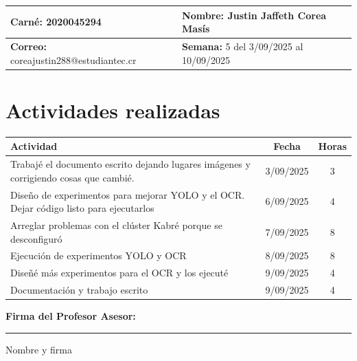 \documentclass[12pt,a4paper]{article}
\begin{document}
\noindent
\begin{tabularx}{\textwidth}{|X|X|}
\hline
\textbf{Carné:} 2020045294 & \textbf{Nombre:} Justin Jaffeth Corea Masís \\
\hline
\textbf{Correo:} coreajustin288@estudiantec.cr & \textbf{Semana:} 5 del 3/09/2025 al 10/09/2025 \\
\hline
\end{tabularx}

\vspace{0.5cm}

\section*{Actividades realizadas}

\begin{tabularx}{\textwidth}{|>{\raggedright\arraybackslash}p{12cm}|c|c|}
\hline
\textbf{Actividad} & \textbf{Fecha} & \textbf{Horas} \\
\hline
	Trabajé el documento escrito dejando lugares imágenes y corrigiendo cosas que cambié. & 3/09/2025 & 3 \\
\hline
	Diseño de experimentos para mejorar YOLO y el OCR. Dejar código listo para ejecutarlos & 6/09/2025 & 4 \\
\hline
	Arreglar problemas con el clúster Kabré porque se desconfiguró & 7/09/2025 & 8 \\
\hline
	Ejecución de experimentos YOLO y OCR & 8/09/2025 & 8 \\
\hline 
	Diseñé más experimentos para el OCR y los ejecuté & 9/09/2025 & 4 \\
\hline
	Documentación y trabajo escrito & 9/09/2025 & 4 \\
\hline
\end{tabularx}

\vspace{1cm}

\noindent
\textbf{Firma del Profesor Asesor:}

\vspace{2cm}

\noindent\rule{8cm}{0.4pt}  
Nombre y firma

\newpage
\end{document}
